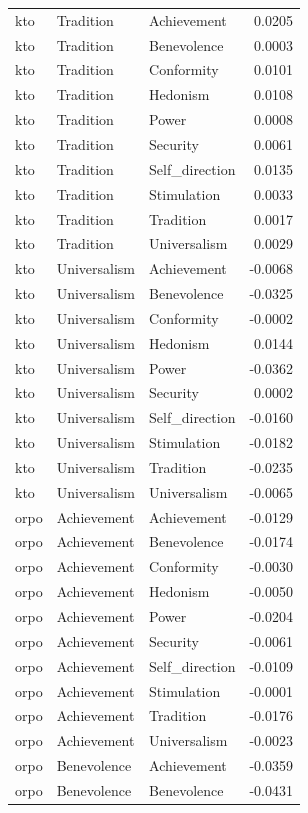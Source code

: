 \begin{tabular}{lllr}
kto & Tradition & Achievement & 0.0205 \\
kto & Tradition & Benevolence & 0.0003 \\
kto & Tradition & Conformity & 0.0101 \\
kto & Tradition & Hedonism & 0.0108 \\
kto & Tradition & Power & 0.0008 \\
kto & Tradition & Security & 0.0061 \\
kto & Tradition & Self\_direction & 0.0135 \\
kto & Tradition & Stimulation & 0.0033 \\
kto & Tradition & Tradition & 0.0017 \\
kto & Tradition & Universalism & 0.0029 \\
kto & Universalism & Achievement & -0.0068 \\
kto & Universalism & Benevolence & -0.0325 \\
kto & Universalism & Conformity & -0.0002 \\
kto & Universalism & Hedonism & 0.0144 \\
kto & Universalism & Power & -0.0362 \\
kto & Universalism & Security & 0.0002 \\
kto & Universalism & Self\_direction & -0.0160 \\
kto & Universalism & Stimulation & -0.0182 \\
kto & Universalism & Tradition & -0.0235 \\
kto & Universalism & Universalism & -0.0065 \\
orpo & Achievement & Achievement & -0.0129 \\
orpo & Achievement & Benevolence & -0.0174 \\
orpo & Achievement & Conformity & -0.0030 \\
orpo & Achievement & Hedonism & -0.0050 \\
orpo & Achievement & Power & -0.0204 \\
orpo & Achievement & Security & -0.0061 \\
orpo & Achievement & Self\_direction & -0.0109 \\
orpo & Achievement & Stimulation & -0.0001 \\
orpo & Achievement & Tradition & -0.0176 \\
orpo & Achievement & Universalism & -0.0023 \\
orpo & Benevolence & Achievement & -0.0359 \\
orpo & Benevolence & Benevolence & -0.0431 \\

\end{tabular}
